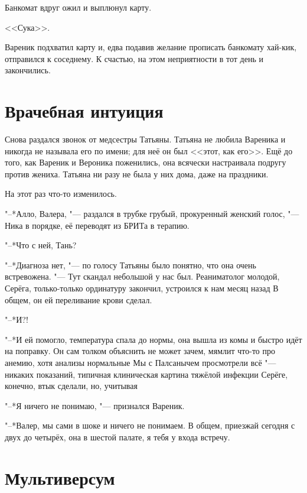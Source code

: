 Банкомат вдруг ожил и выплюнул карту.

<<Сука>>.

Вареник подхватил карту и, едва подавив желание прописать банкомату хай-кик, отправился к соседнему.
К счастью, на этом неприятности в тот день и закончились.

\section{Врачебная интуиция}

Снова раздался звонок от медсестры Татьяны.
Татьяна не любила Вареника и никогда не называла его по имени;
для неё он был <<этот, как его>>.
Ещё до того, как Вареник и Вероника поженились, она всячески настраивала подругу против жениха.
Татьяна ни разу не была у них дома, даже на праздники.

На этот раз что-то изменилось.

"--*Алло, Валера, "--- раздался в трубке грубый, прокуренный женский голос, "--- Ника в порядке, её переводят из БРИТа в терапию.

"--*Что с ней, Тань?

"--*Диагноза нет, "--- по голосу Татьяны было понятно, что она очень встревожена.
"--- Тут скандал небольшой у нас был.
Реаниматолог молодой, Серёга, только-только ординатуру закончил, устроился к нам месяц назад\ldotst 
В общем, он ей переливание крови сделал.

"--*И?!

"--*И ей помогло, температура спала до нормы, она вышла из комы и быстро идёт на поправку.
Он сам толком объяснить не может зачем, мямлит что-то про анемию, хотя анализы нормальные\ldotst
Мы с Палсанычем просмотрели всё "--- никаких показаний, типичная клиническая картина тяжёлой инфекции\ldotst
Серёге, конечно, втык сделали, но, учитывая\ldotst

"--*Я ничего не понимаю, "--- признался Вареник.

"--*Валер, мы сами в шоке и ничего не понимаем.
В общем, приезжай сегодня с двух до четырёх, она в шестой палате, я тебя у входа встречу.

\section{\spacing}

\section{Мультиверсум}

